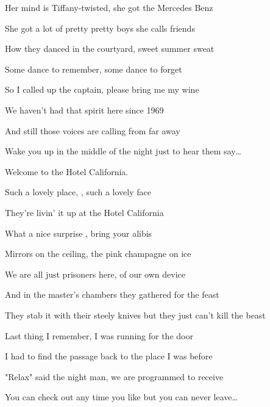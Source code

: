 \begin{song}
 Her mind is Tiffany-twisted,  she got the Mercedes Benz \par
{} She got a lot of pretty pretty boys  she calls friends \par
{} How they danced in the courtyard, sweet summer sweat \par
{} Some dance to remember,  some dance to forget \par

\bigskip

 So I called up the captain,  please bring me my wine  \par
{} We haven't had that spirit here since  1969 \par
{} And still those voices are calling from far away \par
{} Wake you up in the middle of the night  just to hear them say… \par

\bigskip

 Welcome to the Hotel California. \par
Such a lovely place, , such a lovely face \par
They're livin' it up at the Hotel California \par
What a nice surprise , bring your alibis \par

\bigskip

 Mirrors on the ceiling,  the pink champagne on ice  \par
{} We are all just prisoners here,  of our own device \par
{} And in the master's chambers  they gathered for the feast \par
{} They stab it with their steely knives but they just can't kill the beast \par

\bigskip

 Last thing I remember, I was  running for the door \par
{} I had to find the passage back to the place I was before \par
{} "Relax" said the night man, we are  programmed to receive \par
{} You can check out any time you like  but you can never leave… \par

\bigskip

\Outro \par
{}    \par
{}    \par
{}

\end{song}
